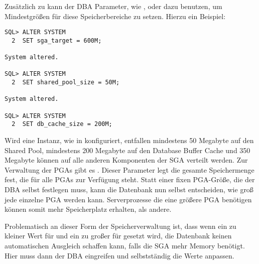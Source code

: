         Zus\"atzlich zu  kann der DBA Parameter, wie ,  oder  dazu benutzen, um Mindestgr\"o\ss{}en f\"ur diese Speicherbereiche zu setzen. Hierzu ein Beispiel:
        \begin{lstlisting}[caption={Ein Rechenbeispiel},label=admin23,language=oracle_sql]
SQL> ALTER SYSTEM
  2  SET sga_target = 600M;

System altered.

SQL> ALTER SYSTEM
  2  SET shared_pool_size = 50M;

System altered.

SQL> ALTER SYSTEM
  2  SET db_cache_size = 200M;
        \end{lstlisting}
        Wird eine Instanz, wie in  konfiguriert, entfallen mindestens 50 Megabyte auf den Shared Pool, mindestens 200 Megabyte auf den Database Buffer Cache und 350 Megabyte k\"onnen auf alle anderen Komponenten der SGA verteilt werden.
\clearpage
        Zur Verwaltung der PGAs gibt es . Dieser Parameter legt die gesamte Speichermenge fest, die f\"ur alle PGAs zur Verf\"ugung steht. Statt einer fixen PGA-Gr\"o\ss{}e, die der DBA selbst festlegen muss, kann die Datenbank nun selbst entscheiden, wie gro\ss{} jede einzelne PGA werden kann. Serverprozesse die eine gr\"o\ss{}ere PGA ben\"otigen k\"onnen somit mehr Speicherplatz erhalten, als andere.

        Problematisch an dieser Form der Speicherverwaltung ist, dass wenn ein zu kleiner Wert f\"ur  und ein zu gro\ss{}er f\"ur  gesetzt wird, die Datenbank keinen automatischen Ausgleich schaffen kann, falls die SGA mehr Memory ben\"otigt. Hier muss dann der DBA eingreifen und selbstst\"andig die Werte anpassen.
